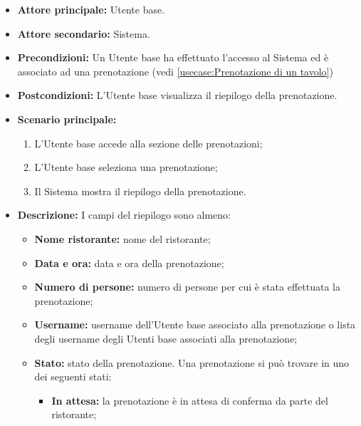 \label{usecase:Visualizzazione del riepilogo prenotazione}
\begin{itemize}
	\item \textbf{Attore principale:} Utente base.

	\item \textbf{Attore secondario:} Sistema.

	\item \textbf{Precondizioni:}
	      Un Utente base ha effettuato l'accesso al Sistema ed è associato ad una
	      prenotazione (vedi \autoref{usecase:Prenotazione di un tavolo})

	\item \textbf{Postcondizioni:}
	      L'Utente base visualizza il riepilogo della prenotazione.

	\item \textbf{Scenario principale:}
	      \begin{enumerate}
		      \item L'Utente base accede alla sezione delle prenotazioni;
		      \item L'Utente base seleziona una prenotazione;
		      \item Il Sistema mostra il riepilogo della prenotazione.
	      \end{enumerate}

	\item \textbf{Descrizione:}
	      I campi del riepilogo sono almeno:
	      \begin{itemize}
		      \item \textbf{Nome ristorante:} nome del ristorante;
		      \item \textbf{Data e ora:} data e ora della prenotazione;
		      \item \textbf{Numero di persone:} numero di persone per cui è
		            stata effettuata la prenotazione;
		      \item \textbf{Username:} username dell'Utente base
		            associato alla prenotazione o lista degli username degli
		            Utenti base associati alla prenotazione;

		      \item \textbf{Stato:} stato della prenotazione. Una
		            prenotazione si può trovare in uno dei seguenti stati:
		            \begin{itemize}
			            \item \textbf{In attesa:} la prenotazione è
			                  in attesa di conferma da parte del ristorante;


\end{itemize}
\end{itemize}
\end{itemize}
